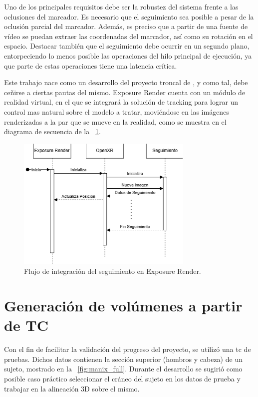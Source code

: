 Uno de los principales requisitos debe ser la robustez del sistema frente a las oclusiones del marcador. Es necesario que el seguimiento sea posible a pesar de la oclusión parcial del marcador. Además, es preciso que a partir de una fuente de vídeo se puedan extraer las coordenadas del marcador, así como su rotación en el espacio. Destacar también que el seguimiento debe ocurrir en un segundo plano, entorpeciendo lo menos posible las operaciones del hilo principal de ejecución, ya que parte de estas operaciones tiene una latencia crítica.

Este trabajo nace como un desarrollo del proyecto troncal de \citeauthor{IglesiasGuitian2022}, y como tal, debe ceñirse a ciertas pautas del mismo. Exposure Render cuenta con un módulo de realidad virtual, en el que se integrará la solución de tracking para lograr un control mas natural sobre el modelo a tratar, moviéndose en las imágenes renderizadas a la par que se mueve en la realidad, como se muestra en el diagrama de secuencia de la \figurename~\ref{fig:flow_exposure}.

\begin{figure}
  \centering
  \includegraphics[width=0.75\textwidth]{imaxes/flow_exposure.png}
  \caption{Flujo de integración del seguimiento en Exposure Render.}
  \label{fig:flow_exposure}
\end{figure}

\section{Generación de volúmenes a partir de TC}
Con el fin de facilitar la validación del progreso del proyecto, se utilizó una \acrshort{tc} de pruebas. Dichos datos contienen la sección superior (hombros y cabeza) de un sujeto, mostrado en la \figurename~\ref{fig:manix_full}. Durante el desarrollo se sugirió como posible caso práctico seleccionar el cráneo del sujeto en los datos de prueba y trabajar en la alineación 3D sobre el mismo.

